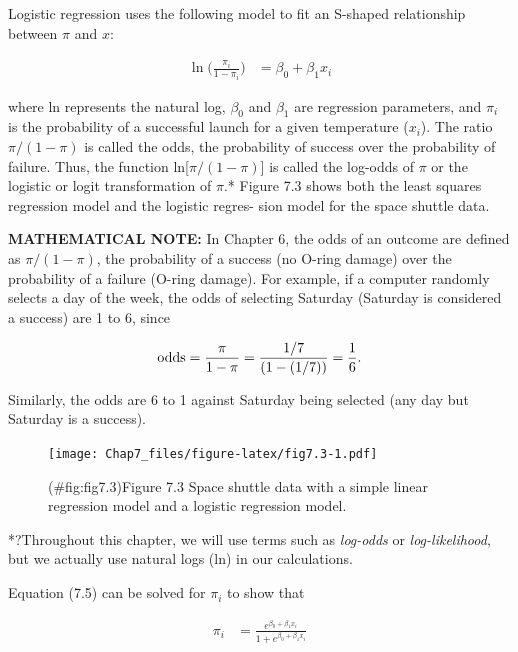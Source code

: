 \documentclass[
]{report}
\begin{document}
Logistic regression uses the following model to fit an S-shaped relationship between \(\pi\) and \(x\):

\begin{align}
\ln\bigl(\frac{\pi_i}{1 - \pi_i}\bigr) &= \beta_0 + \beta_1 x_i 
\tag{7.5}
\end{align}

where ln represents the natural log, \(\beta_0\) and \(\beta_1\) are regression parameters, and \(\pi_i\) is the probability of a successful launch for a given temperature (\(x_i\)). The ratio \(\pi/(1 - \pi)\) is called the odds, the probability of success over the probability of failure. Thus, the function ln{[}\(\pi/(1 - \pi)\){]} is called the log-odds of \(\pi\) or the logistic or logit transformation of \(\pi\).* Figure 7.3 shows both the least squares regression model and the logistic regres-
sion model for the space shuttle data.

\large

\textbf{MATHEMATICAL NOTE:}
In Chapter 6, the odds of an outcome are defined as \(\pi/(1 - \pi)\), the probability of a success (no O-ring damage) over the probability of a failure (O-ring damage). For example, if a computer randomly selects a day of the week, the odds of selecting Saturday (Saturday is considered a success) are 1 to 6, since

\begin{align}
\text{odds} = \frac{\pi}{1 - \pi} = \frac{1/7}{(1 - (1/7))} = \frac{1}{6}.
\notag
\end{align}

Similarly, the odds are 6 to 1 against Saturday being selected (any day but Saturday is a success).
\normalsize

\begin{figure}
\centering
\texttt{[image: Chap7\_files/figure-latex/fig7.3-1.pdf]}
\caption{(\#fig:fig7.3)Figure 7.3 Space shuttle data with a simple linear regression model and a logistic regression model.}
\end{figure}

*?Throughout this chapter, we will use terms such as \textit{log-odds} or \textit{log-likelihood}, but we actually use natural logs (ln) in
our calculations.

Equation (7.5) can be solved for \(\pi_i\) to show that

\begin{align}
\pi_i &= \frac{e^{\beta_0 + \beta_1 x_i}}{1 + e^{\beta_0 + \beta_1 x_i}} \tag{7.6}
\end{align}
\end{document}
